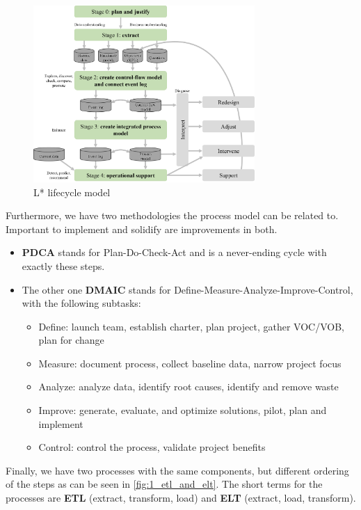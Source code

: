 \begin{figure}[H]
  \centering
  \includegraphics[width=0.75\textwidth]{assets/basics/l_star.png}
  \caption{L* lifecycle model}
  \label{fig:1_l_star}
\end{figure}


Furthermore, we have two methodologies the process model can be related to. Important to implement and solidify are improvements in both.
\begin{itemize}
  \item \textbf{PDCA} stands for Plan-Do-Check-Act and is a never-ending cycle with exactly these steps. 
  \item The other one \textbf{DMAIC} stands for Define-Measure-Analyze-Improve-Control, with the following subtasks:
  \begin{itemize}
    \item {\color{gray}\footnotesize Define: launch team, establish charter, plan project, gather VOC/VOB, plan for change}
    \item {\color{gray}\footnotesize Measure: document process, collect baseline data, narrow project focus}
    \item {\color{gray}\footnotesize Analyze: analyze data, identify root causes, identify and remove waste}
    \item {\color{gray}\footnotesize Improve: generate, evaluate, and optimize solutions, pilot, plan and implement}
    \item {\color{gray}\footnotesize Control: control the process, validate project benefits}
  \end{itemize}
\end{itemize}


Finally, we have two processes with the same components, but different ordering of the steps as can be seen in \ref{fig:1_etl_and_elt}. The short terms for the processes are \textbf{ETL} (extract, transform, load) and \textbf{ELT} (extract, load, transform).

